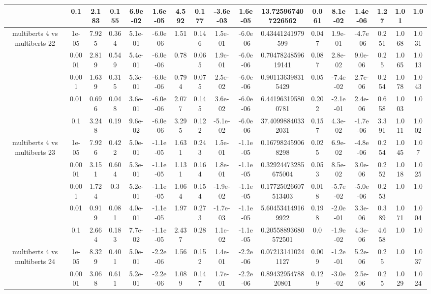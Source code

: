 \begin{tabular}{|c|c|c|c|c|c|c|c|c|c|c|c|c|c|c|c|c|}
 & 0.1 & 2.183 & 0.155 & 6.9e-02 & 1.6e-05 & 4.592 & 0.177 & -3.6e-03 & 1.6e-05 & 13.725967407226562 & 0.061 & 8.1e-02 & 1.4e-06 & 1.27 & 1.01 & 1.0 \\
\hline
\multirow{5}{*}{multiberts 4 vs multiberts 22} & 1e-05 & 7.925 & 0.364 & 5.1e-01 & -6.0e-06 & 1.51 & 0.146 & 1.5e-01 & -6.0e-06 & 0.43441241979599 & 0.047 & 1.9e-01 & -4.7e-06 & 0.251 & 1.068 & 1.031 \\
 & 0.0001 & 2.819 & 0.549 & 5.4e-01 & -6.0e-06 & 0.78 & 0.065 & 1.9e-01 & -6.0e-06 & 0.7047824859619141 & 0.087 & 2.8e-02 & 9.0e-06 & 0.25 & 1.065 & 1.013 \\
 & 0.001 & 1.639 & 0.315 & 5.3e-01 & -6.0e-06 & 0.794 & 0.075 & 2.5e-02 & -6.0e-06 & 0.901136398315429 & 0.05 & -7.4e-02 & 2.7e-06 & 0.254 & 1.078 & 1.043 \\
 & 0.01 & 0.696 & 0.048 & 3.6e-01 & -6.0e-06 & 2.077 & 0.145 & 3.6e-02 & -6.0e-06 & 6.441963195800781 & 0.202 & -2.1e-01 & 2.4e-06 & 0.658 & 1.003 & 1.0 \\
 & 0.1 & 3.248 & 0.19 & 9.6e-02 & -6.0e-06 & 3.295 & 0.122 & -5.1e-02 & -6.0e-06 & 37.40998840332031 & 0.157 & 4.3e-02 & -1.7e-06 & 3.391 & 1.011 & 1.002 \\
\hline
\multirow{5}{*}{multiberts 4 vs multiberts 23} & 1e-05 & 7.926 & 0.422 & 5.0e-01 & -1.1e-05 & 1.631 & 0.243 & 1.5e-01 & -1.1e-05 & 0.167982459068298 & 0.025 & 6.9e-02 & -4.8e-06 & 0.254 & 1.045 & 1.07 \\
 & 0.0001 & 3.151 & 0.604 & 5.3e-01 & -1.1e-05 & 1.131 & 0.164 & 1.8e-01 & -1.1e-05 & 0.32924473285675004 & 0.053 & 8.5e-02 & 3.0e-06 & 0.252 & 1.018 & 1.025 \\
 & 0.001 & 1.724 & 0.3 & 5.2e-01 & -1.1e-05 & 1.064 & 0.154 & -1.9e-02 & -1.1e-05 & 0.17725026607513403 & 0.018 & -5.7e-02 & -5.0e-06 & 0.253 & 1.0 & 1.0 \\
 & 0.01 & 0.919 & 0.081 & 4.0e-01 & -1.1e-05 & 1.97 & 0.273 & -1.7e-03 & -1.1e-05 & 5.604534149169922 & 0.198 & -2.0e-01 & 3.3e-06 & 0.389 & 1.071 & 1.004 \\
 & 0.1 & 2.664 & 0.183 & 7.7e-02 & -1.1e-05 & 2.437 & 0.28 & 1.1e-02 & -1.1e-05 & 0.20558893680572501 & 0.0 & -1.9e-02 & 4.3e-06 & 4.658 & 1.0 & 1.0 \\
\hline
\multirow{5}{*}{multiberts 4 vs multiberts 24} & 1e-05 & 8.329 & 0.401 & 5.0e-01 & -2.2e-06 & 1.56 & 0.152 & 1.4e-01 & -2.2e-06 & 0.072131410241127 & 0.009 & -1.2e-01 & 5.2e-06 & 0.25 & 1.0 & 1.037 \\
 & 0.0001 & 3.068 & 0.611 & 5.2e-01 & -2.2e-06 & 1.089 & 0.147 & 1.7e-01 & -2.2e-06 & 0.8943295478820801 & 0.129 & -3.0e-02 & 2.5e-06 & 0.25 & 1.029 & 1.024 \\

\end{tabular}
